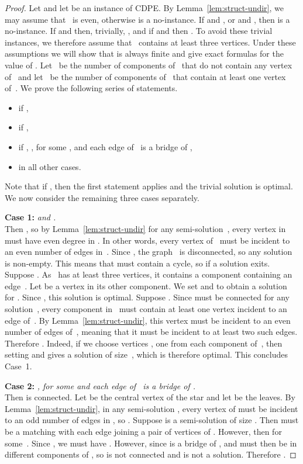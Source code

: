 \documentclass[11pt]{llncs}
\newcommand{\cdpe}{{\sc CDPE}}
\newcommand\displaycase[1]{{\bf #1}}
\begin{document}
\begin{proof}
Let  and let  be an instance of \cdpe.  By
Lemma~\ref{lem:struct-undir}, we may assume that~ is even, otherwise
 is a no-instance.  If  and , or  and
, then  is a no-instance.  
If  and  then, trivially, , and if
 and  then .
To avoid these trivial
instances, we therefore assume that~ contains at least three vertices.
Under these assumptions we will show that  is always finite and give exact formulas for the value of . 
Let~ be the number of components of~ that do not contain
any vertex of~ and let~ be the number of components of~ that contain
at least one vertex of~.
We  prove the following series of statements.

\begin{itemize}
\item  if ,
\item  if ,
\item  if ,  
, for some , and each edge of~ is a bridge of ,
\item  in all other cases.
\end{itemize}

\smallskip
\noindent
Note that if , then the first statement applies and the trivial
solution  is optimal.
We now consider the remaining three cases separately.

\medskip
\noindent
\displaycase{Case 1:} {\em and .}\\
Then , so by Lemma~\ref{lem:struct-undir} for any
semi-solution~, every vertex in  must have even degree in
.  In other words, every vertex of~ must be incident to an
even number of edges in~.  Since , the graph~ is
disconnected, so any solution  is non-empty.  This means that
 must contain a cycle, so  if a solution
exits.
Suppose . As~ has at least three vertices, it contains a component containing an edge~. Let  be a vertex in its
other component. We set  and  to obtain a solution for .
Since , this solution is optimal. Suppose . Since  must be connected for any
solution~, every component in~ must contain at least one vertex
incident to an edge of~. By Lemma~\ref{lem:struct-undir}, this vertex must
be incident to an even number of edges of~, meaning that it must be
incident to at least two such edges. Therefore .
Indeed, if we choose vertices , one from each component of~,
then setting  and 
gives a solution of size~, which is therefore optimal.
This concludes Case~1.


\medskip
\noindent
\displaycase{Case 2:} {\em ,  for some  and each edge
of~ is a bridge of .}\\
Then  is connected.  Let  be the central vertex of the star and
let  be the leaves.  By Lemma~\ref{lem:struct-undir}, in any
semi-solution , every vertex of  must be incident to an odd number of
edges in , so . Suppose 
is a semi-solution of size . Then  must be a
matching with each edge joining a pair of vertices of . However, then
 for some~. Since , we must have
. However, since  is a bridge of ,  and 
must then be in different components of , so  is not connected
and  is not a solution.  Therefore .


\end{proof}
\end{document}
